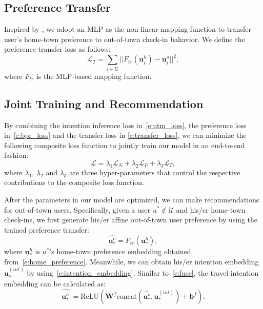 \documentclass[letterpaper]{article} %
\begin{document}
\subsection{Preference Transfer}
Inspired by \cite{man2017cross}, we adopt an MLP as the non-linear mapping function to transfer user's home-town preference to out-of-town check-in bahavior.
We define the preference transfer loss as follows:
\begin{equation}\label{e:transfer_loss}
    \mathcal{L}_T =
    \sum_{i \in \mathcal{U}}
     ||F_{tr}\left(\mathbf{u}^h_i\right) - \mathbf{u}^o_i||^2 ,
\end{equation}
where $F_{tr}$ is the MLP-based mapping function.


\subsection{Joint Training and Recommendation}
By combining the intention inference loss in~\cref{e:ntm_loss}, the preference loss in~\cref{e:bpr_loss} and the transfer loss in \cref{e:transfer_loss}, we can minimize the following composite loss function to jointly train our model in an end-to-end fashion:
\begin{equation}\label{e:joint_loss}
    \mathcal{L} = \lambda_1 \mathcal{L}_N +
    \lambda_2 \mathcal{L}_P +
    \lambda_3 \mathcal{L}_T ,
\end{equation}
where $\lambda_1$, $\lambda_2$ and $\lambda_3$ are three hyper-parameters that control the respective contributions to the composite loss function.

After the parameters in our model are optimized, we can make recommendations for out-of-town users.
Specifically, given a user $u^{\ast} \notin \mathcal{U}$ and his/er home-town check-ins, we first generate his/er affine out-of-town user preference by using the trained preference transfer:
\begin{equation}\label{e:affine}
    \widehat{\mathbf{u}^o_{\ast}} = F_{tr}(\mathbf{u}^h_{\ast}) ,
\end{equation}
where $\mathbf{u}^h_{\ast}$ is $u^{\ast}$'s home-town preference embedding obtained from~\cref{e:home_preference}.
Meanwhile, we can obtain his/er intention embedding $\mathbf{u}^{(int)}_{\ast}$ by using~\cref{e:intention_embedding}.
Similar to~\cref{e:fuse}, the travel intention embedding can be calculated as:
\begin{equation}\label{e:fuse_test}
    \widehat{{\mathbf{u}^o_{\ast}}^{\prime}} =
    \mathrm{ReLU}\left(
    \mathbf{W}^f \mathrm{concat} \left(
        \widehat{\mathbf{u}^o_{\ast}}, \mathbf{u}^{(int)}_{\ast}
    \right)
    + \bm{b}^f
    \right) .
\end{equation}
\end{document}
